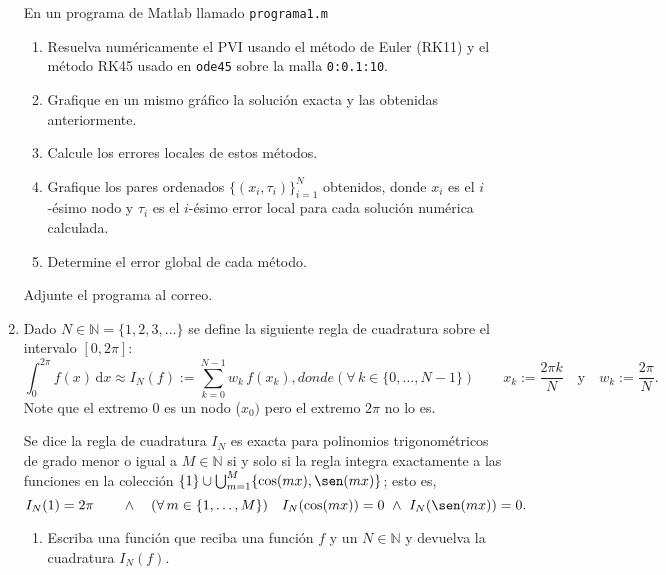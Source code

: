 \documentclass[legalpaper,11pt]{article}
\begin{document}
\begin{enumerate}
En un programa de Matlab llamado \texttt{programa1.m}
\begin{enumerate}
\item{}  Resuelva num\'ericamente el PVI usando el m\'etodo de Euler (RK11) y el m\'etodo RK45 usado en \texttt{ode45} sobre la malla \texttt{0:0.1:10}.
\item {}  Grafique en un mismo gr\'afico la soluci\'on exacta y las obtenidas anteriormente.
\item{}  Calcule los errores locales de estos m\'etodos.
\item  {} Grafique los pares ordenados $\{(x_i,\tau_i)\}_{i=1}^N$ obtenidos, donde $x_i$ es el $i$-\'esimo nodo y $\tau_i$ es el $i$-\'esimo error local para cada soluci\'on num\'erica calculada.
\item {} Determine el error global de cada m\'etodo.
\end{enumerate}
Adjunte el programa al correo.



\newpage
{}
\item   Dado $N \in \mathbb{N} = \{1, 2, 3, \dotsc\}$ se define la siguiente regla de cuadratura sobre el intervalo $[0,2\pi]$:
%
\begin{subequations}\label{trig-quad}
\begin{equation}
\int_0^{2\pi} f(x) \, \mathrm{d}x \approx I_N(f) := \sum_{k=0}^{N-1} w_k \, f(x_k),
\end{equation}
%
donde
%
\begin{equation}
(\forall\,k\in\{0,\dotsc,N-1\}) \qquad x_k := \frac{2\pi k}{N} \quad\text{y}\quad w_k := \frac{2\pi}{N}.
\end{equation}
\end{subequations}
%
Note que el extremo $0$ es un nodo ($x_0)$ pero el extremo $2\pi$ no lo es.

Se dice la regla de cuadratura $I_N$ es exacta para polinomios trigonom\'etricos de grado menor o igual a $M \in \mathbb{N}$ si y solo si la regla integra exactamente a las funciones en la colecci\'on $\{1\} \cup \bigcup_{m=1}^M \{ \cos(mx), \sen(mx) \}$; esto es,
%
\begin{equation*}
I_N(1) = 2\pi \qquad\wedge\quad (\forall\,m\in\{1,\dotsc,M\}) \quad I_N(\cos(mx)) = 0 \ \wedge\ I_N(\sen(mx)) = 0.
\end{equation*}

\begin{enumerate}
\item {} Escriba una funci\'on \matlab que reciba una funci\'on $f$ y un $N \in \mathbb{N}$ y devuelva la cuadratura $I_N(f)$.


\end{enumerate}
\end{enumerate}
\end{document}
